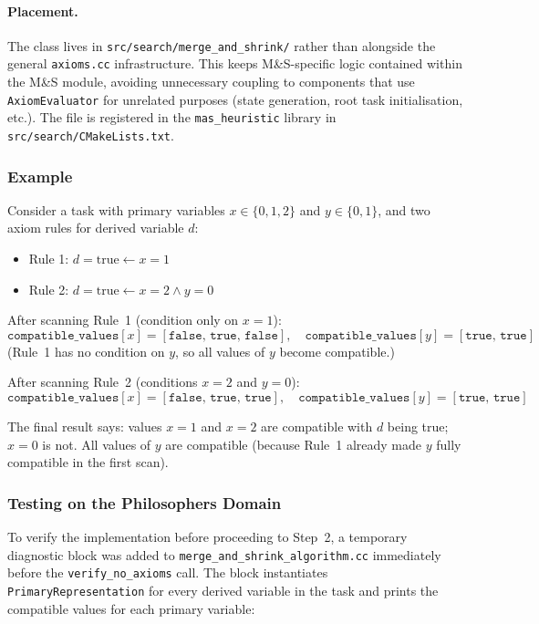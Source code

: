 \documentclass[11pt,a4paper]{article}
\begin{document}
\paragraph{Placement.}  The class lives in
\texttt{src/search/merge\_and\_shrink/} rather than alongside the general
\texttt{axioms.cc} infrastructure.  This keeps M\&S-specific logic contained
within the M\&S module, avoiding unnecessary coupling to components that use
\texttt{AxiomEvaluator} for unrelated purposes (state generation, root task
initialisation, etc.).  The file is registered in the \texttt{mas\_heuristic}
library in \texttt{src/search/CMakeLists.txt}.

\subsubsection{Example}

Consider a task with primary variables $x \in \{0,1,2\}$ and $y \in \{0,1\}$,
and two axiom rules for derived variable $d$:

\begin{itemize}
  \item Rule 1: $d = \text{true} \leftarrow x = 1$
  \item Rule 2: $d = \text{true} \leftarrow x = 2 \wedge y = 0$
\end{itemize}

After scanning Rule~1 (condition only on $x = 1$):
\[
  \texttt{compatible\_values}[x] = [\texttt{false},\, \texttt{true},\, \texttt{false}],
  \quad
  \texttt{compatible\_values}[y] = [\texttt{true},\, \texttt{true}]
\]
(Rule~1 has no condition on $y$, so all values of $y$ become compatible.)

After scanning Rule~2 (conditions $x = 2$ and $y = 0$):
\[
  \texttt{compatible\_values}[x] = [\texttt{false},\, \texttt{true},\, \texttt{true}],
  \quad
  \texttt{compatible\_values}[y] = [\texttt{true},\, \texttt{true}]
\]

The final result says: values $x=1$ and $x=2$ are compatible with $d$ being
true; $x=0$ is not.  All values of $y$ are compatible (because Rule~1 already
made $y$ fully compatible in the first scan).

\subsubsection{Testing on the Philosophers Domain}

To verify the implementation before proceeding to Step~2, a temporary
diagnostic block was added to \texttt{merge\_and\_shrink\_algorithm.cc}
immediately before the \texttt{verify\_no\_axioms} call.  The block
instantiates \texttt{PrimaryRepresentation} for every derived variable in the
task and prints the compatible values for each primary variable:
\end{document}
